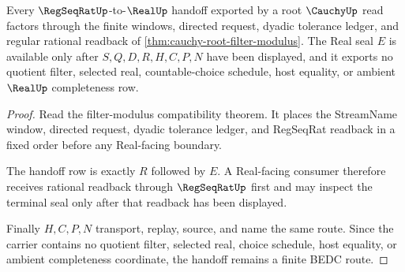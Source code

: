 \begin{theorem}
\label{thm:cauchy-root-regseqrat-real-handoff}
Every $\RegSeqRatUp$-to-$\RealUp$ handoff exported by a root $\CauchyUp$ read factors through the finite windows, directed request, dyadic tolerance ledger, and regular rational readback of \autoref{thm:cauchy-root-filter-modulus}. The Real seal $E$ is available only after $S,Q,D,R,H,C,P,N$ have been displayed, and it exports no quotient filter, selected real, countable-choice schedule, host equality, or ambient $\RealUp$ completeness row.
\end{theorem}
\begin{proof}
Read the filter-modulus compatibility theorem. It places the StreamName window, directed request, dyadic tolerance ledger, and RegSeqRat readback in a fixed order before any Real-facing boundary.

The handoff row is exactly $R$ followed by $E$. A Real-facing consumer therefore receives rational readback through $\RegSeqRatUp$ first and may inspect the terminal seal only after that readback has been displayed.

Finally $H,C,P,N$ transport, replay, source, and name the same route. Since the carrier contains no quotient filter, selected real, choice schedule, host equality, or ambient completeness coordinate, the handoff remains a finite BEDC route.
\end{proof}
